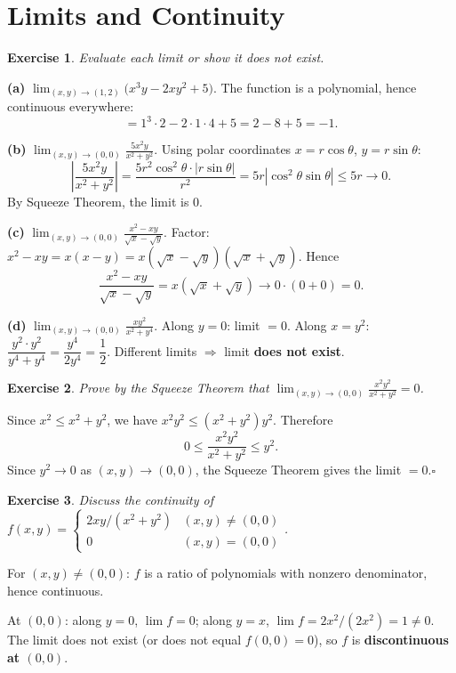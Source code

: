 \documentclass[12pt,a4paper]{article}
\theoremstyle{exstyle}
\newtheorem{exercise}{Exercise}[section]
\begin{document}
\section{Limits and Continuity}

\begin{exercise}
Evaluate each limit or show it does not exist.
\end{exercise}
\begin{solbox}
\textbf{(a)} $\displaystyle\lim_{(x,y)\to(1,2)}\bigl(x^3y-2xy^2+5\bigr)$.
The function is a polynomial, hence continuous everywhere:
\[
  =1^3\cdot 2-2\cdot 1\cdot 4+5=2-8+5=-1.
\]

\textbf{(b)} $\displaystyle\lim_{(x,y)\to(0,0)}\frac{5x^2y}{x^2+y^2}$.
Using polar coordinates $x=r\cos\theta$, $y=r\sin\theta$:
\[
  \left|\frac{5x^2y}{x^2+y^2}\right|=\frac{5r^2\cos^2\theta\cdot|r\sin\theta|}{r^2}
  =5r|\cos^2\theta\sin\theta|\le 5r\to 0.
\]
By Squeeze Theorem, the limit is $\boxed{0}$.

\textbf{(c)} $\displaystyle\lim_{(x,y)\to(0,0)}\frac{x^2-xy}{\sqrt{x}-\sqrt{y}}$.
Factor: $x^2-xy=x(x-y)=x(\sqrt{x}-\sqrt{y})(\sqrt{x}+\sqrt{y})$. Hence
\[
  \frac{x^2-xy}{\sqrt{x}-\sqrt{y}}=x(\sqrt{x}+\sqrt{y})\to 0\cdot(0+0)=\boxed{0}.
\]

\textbf{(d)} $\displaystyle\lim_{(x,y)\to(0,0)}\frac{xy^2}{x^2+y^4}$.
Along $y=0$: limit $=0$. Along $x=y^2$: $\dfrac{y^2\cdot y^2}{y^4+y^4}=\dfrac{y^4}{2y^4}=\dfrac{1}{2}$.
Different limits $\Rightarrow$ limit \textbf{does not exist}.
\end{solbox}

\begin{exercise}
Prove by the Squeeze Theorem that $\displaystyle\lim_{(x,y)\to(0,0)}\frac{x^2y^2}{x^2+y^2}=0$.
\end{exercise}
\begin{solbox}
Since $x^2\le x^2+y^2$, we have $x^2y^2\le(x^2+y^2)y^2$. Therefore
\[
  0\le\frac{x^2y^2}{x^2+y^2}\le y^2.
\]
Since $y^2\to 0$ as $(x,y)\to(0,0)$, the Squeeze Theorem gives the limit $=0$.\hfill$\square$
\end{solbox}

\begin{exercise}
Discuss the continuity of
$f(x,y)=\begin{cases}2xy/(x^2+y^2)&(x,y)\neq(0,0)\\0&(x,y)=(0,0)\end{cases}$.
\end{exercise}
\begin{solbox}
For $(x,y)\neq(0,0)$: $f$ is a ratio of polynomials with nonzero denominator, hence continuous.

At $(0,0)$: along $y=0$, $\lim f=0$; along $y=x$, $\lim f=2x^2/(2x^2)=1\neq 0$.
The limit does not exist (or does not equal $f(0,0)=0$), so $f$ is \textbf{discontinuous at $(0,0)$}.
\end{solbox}
\end{document}
